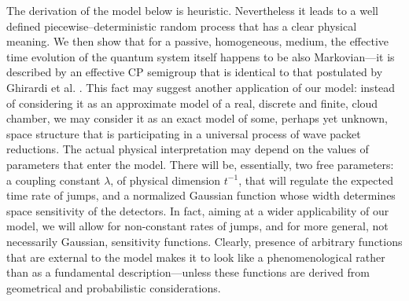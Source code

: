 \documentclass[12pt]{article}
\begin{document}
The derivation of the model below is heuristic. Nevertheless it leads to a
well defined piecewise--deterministic random process that has a clear
physical meaning. We then show that for a passive, homogeneous, medium, the
effective time evolution of the quantum system itself happens to be also
Markovian---it is described by an effective CP semigroup that is identical
to that postulated by Ghirardi et al. \cite{ghi1}. This fact may suggest
another application of our model: instead of considering it as an
approximate model of a real, discrete and finite, cloud chamber, we may
consider it as an exact model of some, perhaps yet unknown,
space structure that is participating in a universal process of wave
packet reductions. The actual physical interpretation may depend on the
values of parameters that enter the model. There will be, essentially, two
free parameters: a coupling constant $\lambda$, of physical dimension
$t^{-1}$, that will regulate the expected time rate of jumps, and a
normalized Gaussian function whose width determines space sensitivity of
the detectors. In fact, aiming at a wider applicability of our model, we
will allow for non-constant rates of jumps, and for more general, not
necessarily Gaussian, sensitivity functions. Clearly, presence of arbitrary
functions that are external to the model makes it to look like a
phenomenological rather than as a fundamental description---unless these
functions are derived from geometrical and probabilistic considerations.
\end{document}

